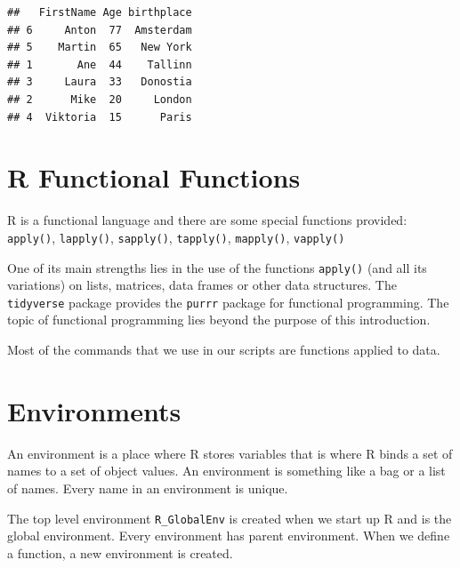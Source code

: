 \documentclass[
]{book}
\newenvironment{Shaded}{\begin{snugshade}}{\end{snugshade}}
\newcommand{\AttributeTok}[1]{\textcolor[rgb]{0.77,0.63,0.00}{#1}}
\newcommand{\ConstantTok}[1]{\textcolor[rgb]{0.00,0.00,0.00}{#1}}
\newcommand{\DecValTok}[1]{\textcolor[rgb]{0.00,0.00,0.81}{#1}}
\newcommand{\FunctionTok}[1]{\textcolor[rgb]{0.00,0.00,0.00}{#1}}
\newcommand{\NormalTok}[1]{#1}
\newcommand{\OtherTok}[1]{\textcolor[rgb]{0.56,0.35,0.01}{#1}}
\newcommand{\SpecialCharTok}[1]{\textcolor[rgb]{0.00,0.00,0.00}{#1}}
\begin{document}
\begin{Shaded}
\end{Shaded}

\begin{verbatim}
##   FirstName Age birthplace
## 6     Anton  77  Amsterdam
## 5    Martin  65   New York
## 1       Ane  44    Tallinn
## 3     Laura  33   Donostia
## 2      Mike  20     London
## 4  Viktoria  15      Paris
\end{verbatim}

\hypertarget{r-functional-functions}{%
\section{R Functional Functions}\label{r-functional-functions}}

R is a functional language and there are some special functions provided:
\texttt{apply()}, \texttt{lapply()}, \texttt{sapply()}, \texttt{tapply()}, \texttt{mapply()}, \texttt{vapply()}

One of its main strengths lies in the use of the functions \texttt{apply()} (and all its variations) on lists, matrices, data frames or other data structures.
The \texttt{tidyverse} package provides the \texttt{purrr} package for functional programming. The topic of functional programming lies beyond the purpose of this introduction.

Most of the commands that we use in our scripts are functions applied to data.

\hypertarget{environments}{%
\section{Environments}\label{environments}}

An environment is a place where R stores variables that is where R binds a set of names to a set of object values. An environment is something like a bag or a list of names. Every name in an environment is unique.

The top level environment \texttt{R\_GlobalEnv} is created when we start up R and is the global environment. Every environment has parent environment. When we define a function, a new environment is created.
\end{document}
